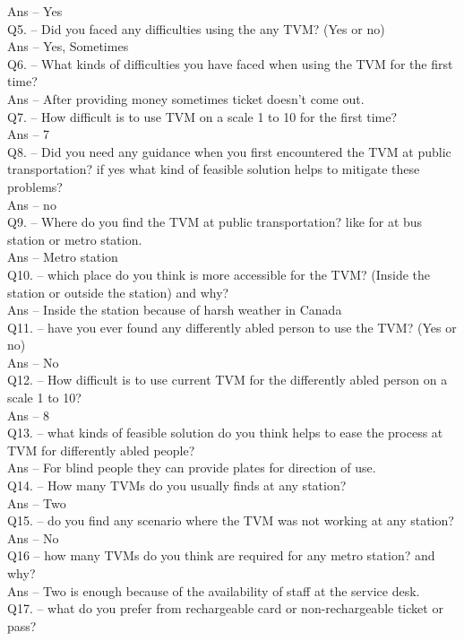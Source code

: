\documentclass[a4paper, 11pt]{report}
\begin{document}
Ans – Yes \\
Q5. – Did you faced any difficulties using the any TVM? (Yes or no) \\
Ans – Yes, Sometimes\\
Q6. – What kinds of difficulties you have faced when using the TVM for the first time? \\
Ans – After providing money sometimes ticket doesn’t come out.  \\
Q7. – How difficult is to use TVM on a scale 1 to 10 for the first time? \\
Ans – 7\\
Q8. – Did you need any guidance when you first encountered the TVM at public transportation? if yes what kind of feasible solution helps to mitigate these problems? \\
Ans – no\\
Q9. – Where do you find the TVM at public transportation? like for at bus station or metro station. \\
Ans – Metro station\\
Q10. – which place do you think is more accessible for the TVM? (Inside the station or outside the station) and why? \\
Ans – Inside the station because of harsh weather in Canada\\
Q11. – have you ever found any differently abled person to use the TVM? (Yes or no) \\
Ans – No\\
Q12. – How difficult is to use current TVM for the differently abled person on a scale 1 to 10? \\
Ans – 8\\
Q13. – what kinds of feasible solution do you think helps to ease the process at TVM for differently abled people? \\
Ans – For blind people they can provide plates for direction of use. \\
Q14. – How many TVMs do you usually finds at any station? \\
Ans – Two \\
Q15. – do you find any scenario where the TVM was not working at any station? \\
Ans – No\\
Q16 – how many TVMs do you think are required for any metro station? and why? \\
Ans – Two is enough because of the availability of staff at the service desk. \\
Q17. – what do you prefer from rechargeable card or non-rechargeable ticket or pass? \\
\end{document}
